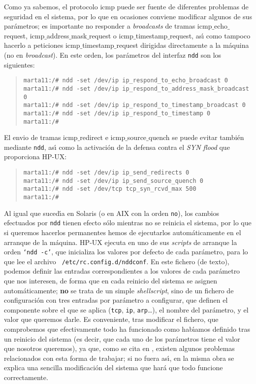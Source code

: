 Como ya sabemos, el protocolo {\sc icmp} puede ser fuente de diferentes 
problemas de seguridad en el sistema, por lo que en ocasiones conviene modificar
algunos de sus par\'ametros; es importante no responder a {\it broadcasts} de
tramas {\sc icmp$\_$echo$\_$request}, {\sc icmp$\_$address$\_$mask$\_$request}
o {\sc icmp$\_$timestamp$\_$request}, as\'{\i} como tampoco hacerlo a 
peticiones {\sc icmp$\_$timestamp$\_$request} dirigidas directamente a la 
m\'aquina (no en {\it broadcast}). En este orden, los par\'ametros del interfaz
{\tt ndd} son los siguientes:
\begin{quote}
\begin{verbatim}
marta11:/# ndd -set /dev/ip ip_respond_to_echo_broadcast 0
marta11:/# ndd -set /dev/ip ip_respond_to_address_mask_broadcast 0
marta11:/# ndd -set /dev/ip ip_respond_to_timestamp_broadcast 0
marta11:/# ndd -set /dev/ip ip_respond_to_timestamp 0
marta11:/#
\end{verbatim}
\end{quote}
El envio de tramas {\sc icmp$\_$redirect} e {\sc icmp$\_$source$\_$quench} se
puede evitar tambi\'en mediante {\tt ndd}, as\'{\i} como la activaci\'on de la
defensa contra el {\it SYN flood} que proporciona HP-UX:
\begin{quote}
\begin{verbatim}
marta11:/# ndd -set /dev/ip ip_send_redirects 0
marta11:/# ndd -set /dev/ip ip_send_source_quench 0
marta11:/# ndd -set /dev/tcp tcp_syn_rcvd_max 500
marta11:/#
\end{verbatim}
\end{quote}
Al igual que suced\'{\i}a en Solaris (o en AIX con la orden {\tt no}), los 
cambios efectuados por {\tt ndd} tienen efecto s\'olo mientras no se reinicia 
el sistema, por lo que si queremos hacerlos permanentes hemos de ejecutarlos 
autom\'aticamente en el arranque de la m\'aquina. HP-UX ejecuta en uno de sus
{\it scripts} de arranque la orden {\tt `ndd -c'}, que inicializa los valores 
por defecto de cada par\'ametro, para lo que lee el archivo {\tt 
/etc/rc.config.d/nddconf}. En este fichero (de texto), podemos definir las 
entradas correspondientes a los valores de cada par\'ametro que nos interesen,
de forma que en cada reinicio del sistema se asignen autom\'aticamente; 
{\bf no} se trata de un simple {\it shellscript}, sino de un fichero de 
configuraci\'on con tres entradas por par\'ametro a configurar, que definen el
componente sobre el que se aplica ({\tt tcp}, {\tt ip}, {\tt arp}\ldots), el
nombre del par\'ametro, y el valor que queremos darle. Es conveniente, tras
modificar el fichero, que comprobemos que efectivamente todo ha funcionado como
hab\'{\i}amos definido tras un reinicio del sistema (es decir, que cada uno de 
los par\'ametros tiene el valor que nosotros queremos), ya que, como se cita en 
\cite{kn:ste00}, existen algunos problemas relacionados con esta forma de 
trabajar; si no fuera as\'{\i}, en la misma obra se explica una sencilla 
modificaci\'on del sistema que har\'a que todo funcione correctamente.
